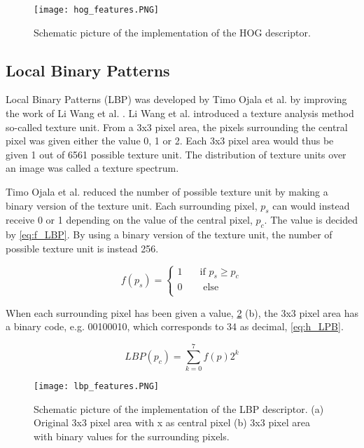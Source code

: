 \FloatBarrier
\begin{figure}[!h]
	\centering
	\texttt{[image: hog\_features.PNG]}
	\caption{Schematic picture of the implementation of the HOG descriptor.
		\label{fig:hog_features}}
\end{figure} 
\FloatBarrier

\subsection{Local Binary Patterns} \label{subsection:LBP}

Local Binary Patterns (LBP) was developed by Timo Ojala et al. \cite{ojala_hog} by improving the work of Li Wang et al. \cite{pre_hog}. Li Wang et al. introduced a texture analysis method so-called texture unit. From a 3x3 pixel area, the pixels surrounding the central pixel was given either the value 0, 1 or 2. Each 3x3 pixel area would thus be given 1 out of 6561 possible texture unit. The distribution of texture units over an image was called a texture spectrum.  

Timo Ojala et al. reduced the number of possible texture unit by making a binary version of the texture unit. Each surrounding pixel, $p_s$ can would instead receive 0 or 1 depending on the value of the central pixel, $p_c$. The value is decided by \cref{eq:f_LBP}. By using a binary version of the texture unit, the number of possible texture unit is instead 256. 

\begin{equation} \label{eq:f_LBP}
f(p_s) = 
 \begin{cases}
 1    & \quad \text{if } p_s \geq p_c\\
 0		& \quad  \text{ else}\\
 \end{cases}
\end{equation}

When each surrounding pixel has been given a value, \cref{fig:lbp_features} (b), the 3x3 pixel area has a binary code, e.g. 00100010, which corresponds to 34 as decimal, \cref{eq:h_LPB}.   

\begin{equation} \label{eq:h_LPB}
LBP(p_c) = \sum_{k=0}^{7} f(p)2^k
\end{equation}

\FloatBarrier
\begin{figure}[!h]
	\centering
	\texttt{[image: lbp\_features.PNG]}
	\caption{Schematic picture of the implementation of the LBP descriptor. (a) Original 3x3 pixel area with x as central pixel (b) 3x3 pixel area with binary values for the surrounding pixels.
		\label{fig:lbp_features}}
\end{figure} 
\FloatBarrier

